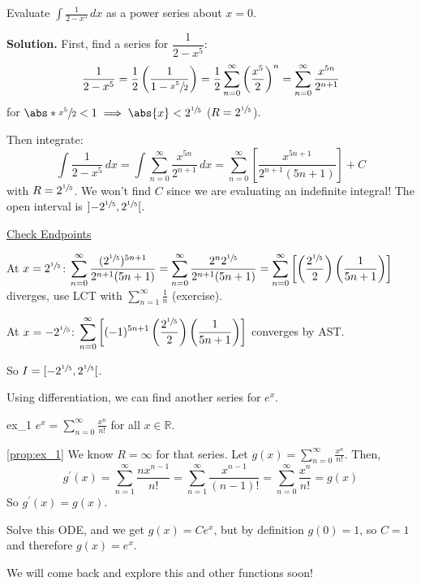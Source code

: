 \begin{Example}{}{}
    Evaluate $ \displaystyle \int \frac{1}{2-x^5} \, d{x}  $
    as a power series about $ x=0 $.

    \textbf{Solution.} First, find a series for $ \dfrac{1}{2-x^5} $:
    \[ \frac{1}{2-x^5}
        =\frac{1}{2} \left( \frac{1}{1-\sfrac{x^5}{2}} \right)
        =\frac{1}{2} \sum\limits_{n=0}^{\infty} \left( \frac{x^5}{2}  \right)^n
        =\sum\limits_{n=0}^{\infty} \frac{x^{5n}}{2^{n+1}}  \]
    for $ \abs*{\sfrac{x^5}{2} }<1\implies \abs{x}<2^{\sfrac{1}{5}} $ ($ R=2^{\sfrac{1}{5}} $).

    Then integrate:
    \[ \int \frac{1}{2-x^5} \, d{x} =
        \int \sum\limits_{n=0}^{\infty} \frac{x^{5n}}{2^{n+1}} \, d{x}
        =\sum\limits_{n=0}^{\infty} \left[ \frac{x^{5n+1}}{2^{n+1}(5n+1)}  \right]+C \]
    with $ R=2^{\sfrac{1}{5}} $. We won't find $ C $ since we are evaluating an
    indefinite integral! The open interval is $ \interval[open]{-2^{\sfrac{1}{5}}}{2^{\sfrac{1}{5}  }} $.

    \underline{Check Endpoints}

    At $ x=2^{\sfrac{1}{5}} $: $ \displaystyle \sum\limits_{n=0}^{\infty}
        \frac{(2^{\sfrac{1}{5}})^{5n+1}}{2^{n+1}(5n+1)}=
        \sum\limits_{n=0}^{\infty} \frac{2^n 2^{\sfrac{1}{5}}}{2^{n+1}(5n+1)}
        =\sum\limits_{n=0}^{\infty} \left[ \left( \frac{2^{\sfrac{1}{5} }}{2} \right)
            \left( \frac{1}{5n+1} \right) \right]  $ diverges,
    use LCT with $ \sum\limits_{n=1}^{\infty} \frac{1}{n} $ (exercise).

    At $ x=-2^{\sfrac{1}{5} } $:
    $ \displaystyle \sum\limits_{n=0}^{\infty}
        \left[(-1)^{5n+1}\left( \frac{2^{\sfrac{1}{5} }}{2}  \right)
            \left( \frac{1}{5n+1}  \right)\right] $ converges by AST\@.

    So $ I=\interval[open right]{-2^{\sfrac{1}{5} }}{2^{\sfrac{1}{5}}} $.
\end{Example}

Using differentiation, we can find another series for $ e^x $.

\begin{Proposition}{}{ex_1}
    $ \displaystyle e^x=\sum\limits_{n=0}^{\infty} \frac{x^n}{n!} $
    for all $ x\in\mathbb{R} $.
\end{Proposition}

\begin{Proof}{\ref{prop:ex_1}}{}
    We know $ R=\infty $ for that series. Let $ g(x)=\displaystyle \sum\limits_{n=0}^{\infty}
        \frac{x^n}{n!} $. Then,
    \[ g^\prime(x)=\sum\limits_{n=1}^{\infty} \frac{n x^{n-1}}{n!}
        =\sum\limits_{n=1}^{\infty} \frac{x^{n-1}}{(n-1)!}
        =\sum\limits_{n=0}^{\infty} \frac{x^n}{n!}=g(x) \]
    So $ g^\prime(x)=g(x) $.

    Solve this ODE, and we get $ g(x)=Ce^x $, but by definition $ g(0)=1 $,
    so $ C=1 $ and therefore $ g(x)=e^x $.
\end{Proof}

We will come back and explore this and other functions soon!
